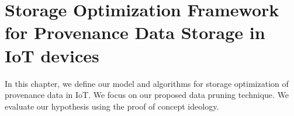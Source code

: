 
\chapter{Storage Optimization Framework for Provenance Data Storage in IoT devices} \label{MostNarrowEasy}

In this chapter, we define our model and algorithms for storage optimization of provenance data in IoT. We focus on our proposed data pruning technique. We evaluate our hypothesis using the proof of concept ideology.

%
%


